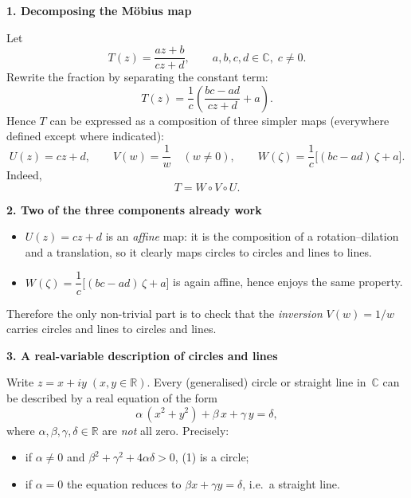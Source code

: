 \documentclass[12pt]{article}
\title{}
\author{Jerich Lee}
\date{\today}
\theoremstyle{definition} %
\theoremstyle{plain} %
\begin{document}
\maketitle

\bigskip
\textbf{1.  Decomposing the Möbius map}

Let
\[
   T(z)=\frac{az+b}{cz+d},\qquad  a,b,c,d\in\mathbb{{C}},\; c\neq 0.
\]
Rewrite the fraction by separating the constant term:
\[
   T(z)=\frac{1}{c}\!\left(\frac{bc-ad}{\,cz+d\,}+a\right).
\]
Hence \(T\) can be expressed as a composition of three simpler maps
(everywhere defined except where indicated):
\[
   U(z)=cz+d,\qquad
   V(w)=\frac{1}{w}\quad(w\neq 0),\qquad
   W(\zeta)=\frac{1}{c}\bigl[(bc-ad)\,\zeta+a\bigr].
\]
Indeed,
\[
   T = W\circ V\circ U.
\]

\bigskip
\textbf{2.  Two of the three components already work}

\begin{itemize}
  \item \(U(z)=cz+d\) is an \emph{affine} map: it is the composition of
        a rotation–dilation and a translation, so it clearly maps circles
        to circles and lines to lines.
  \item \(W(\zeta)=\dfrac{1}{c}\bigl[(bc-ad)\,\zeta+a\bigr]\) is again
        affine, hence enjoys the same property.
\end{itemize}

Therefore the only non-trivial part is to check that the
\emph{inversion} \(V(w)=1/w\) carries circles and lines to circles and
lines.

\bigskip
\textbf{3.  A real-variable description of circles and lines}

Write \(z=x+iy\;(x,y\in\mathbb{R})\).
Every (generalised) circle or straight line in~\(\mathbb{{C}}\) can be described
by a real equation of the form
\[
   \alpha\,(x^{2}+y^{2})+\beta\,x+\gamma\,y=\delta,
   \tag{1}
\]
where \(\alpha,\beta,\gamma,\delta\in\mathbb{R}\) are \emph{not} all
zero.  Precisely:

\begin{itemize}
  \item if \(\alpha\neq 0\) and \(\beta^{2}+\gamma^{2}+4\alpha\delta>0\),
        (1) is a circle;
  \item if \(\alpha=0\) the equation reduces to
        \(\beta x+\gamma y=\delta\), i.e.\ a straight line.
\end{itemize}
\end{document}

